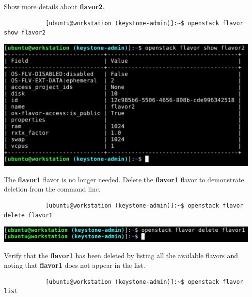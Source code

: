 \documentclass[letterpaper, 12pt]{article}
\begin{document}
\begin{enumerate}
    \begin{labstep}
        Show more details about \textbf{flavor2}.
        \begin{lstlisting}
            [ubuntu@workstation (keystone-admin)]:~$ openstack flavor show flavor2
        \end{lstlisting}

        \begin{center}
            \includegraphics[width=\linewidth]{images/part2/step10.png}
        \end{center}
    \end{labstep}

    \begin{labstep}
        The \textbf{flavor1} flavor is no longer needed.
        Delete the \textbf{flavor1} flavor to demonstrate deletion from the command line.
        \begin{lstlisting}
            [ubuntu@workstation (keystone-admin)]:~$ openstack flavor delete flavor1
        \end{lstlisting}

        \begin{center}
            \includegraphics[width=\linewidth]{images/part2/step11.png}
        \end{center}
    \end{labstep}

    \begin{labstep}
        Verify that the \textbf{flavor1} has been deleted by listing all the available flavors and noting that
        \textbf{flavor1} does not appear in the list.
        \begin{lstlisting}
            [ubuntu@workstation (keystone-admin)]:~$ openstack flavor list
        \end{lstlisting}


\end{labstep}
\end{enumerate}
\end{document}
